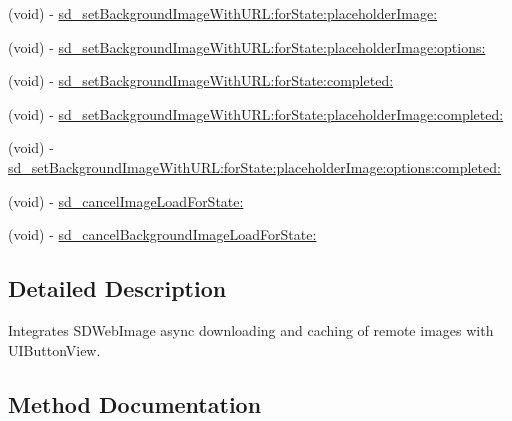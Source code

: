 \begin{DoxyCompactItemize}
\item 
(void) -\/ \hyperlink{category_u_i_button_07_web_cache_08_af40b3dff6cd4a01c373ec874fab8396f}{sd\+\_\+set\+Background\+Image\+With\+U\+R\+L\+:for\+State\+:placeholder\+Image\+:}
\item 
(void) -\/ \hyperlink{category_u_i_button_07_web_cache_08_a8049b2a2e1ec830a342518b0c8c4ffa0}{sd\+\_\+set\+Background\+Image\+With\+U\+R\+L\+:for\+State\+:placeholder\+Image\+:options\+:}
\item 
(void) -\/ \hyperlink{category_u_i_button_07_web_cache_08_ad495d163e91708505f269e82493d1778}{sd\+\_\+set\+Background\+Image\+With\+U\+R\+L\+:for\+State\+:completed\+:}
\item 
(void) -\/ \hyperlink{category_u_i_button_07_web_cache_08_a867d49e144888b4c7ef9cfa4573e8015}{sd\+\_\+set\+Background\+Image\+With\+U\+R\+L\+:for\+State\+:placeholder\+Image\+:completed\+:}
\item 
(void) -\/ \hyperlink{category_u_i_button_07_web_cache_08_a1f8973eb3adfd6e97a9e7613959ae8d9}{sd\+\_\+set\+Background\+Image\+With\+U\+R\+L\+:for\+State\+:placeholder\+Image\+:options\+:completed\+:}
\item 
(void) -\/ \hyperlink{category_u_i_button_07_web_cache_08_a29cb6b84260cc685f2b6d7c746a014d8}{sd\+\_\+cancel\+Image\+Load\+For\+State\+:}
\item 
(void) -\/ \hyperlink{category_u_i_button_07_web_cache_08_a1212bebc5d1a52a7e898c96fd128191d}{sd\+\_\+cancel\+Background\+Image\+Load\+For\+State\+:}
\end{DoxyCompactItemize}


\subsection{Detailed Description}
Integrates S\+D\+Web\+Image async downloading and caching of remote images with U\+I\+Button\+View. 

\subsection{Method Documentation}
\hypertarget{category_u_i_button_07_web_cache_08_a1212bebc5d1a52a7e898c96fd128191d}{}
